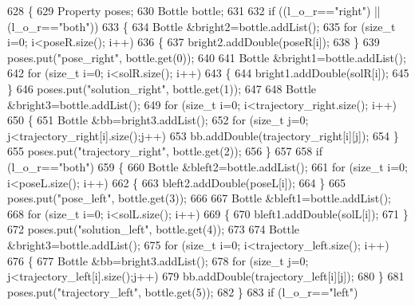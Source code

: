 \begin{DoxyCode}
628 \{
629     Property poses;
630     Bottle bottle;
631 
632     \textcolor{keywordflow}{if} ((l\_o\_r==\textcolor{stringliteral}{"right"}) || (l\_o\_r==\textcolor{stringliteral}{"both"}))
633     \{
634         Bottle &bright2=bottle.addList();
635         \textcolor{keywordflow}{for} (\textcolor{keywordtype}{size\_t} i=0; i<poseR.size(); i++)
636         \{
637             bright2.addDouble(poseR[i]);
638         \}
639         poses.put(\textcolor{stringliteral}{"pose\_right"}, bottle.get(0));
640 
641         Bottle &bright1=bottle.addList();
642         \textcolor{keywordflow}{for} (\textcolor{keywordtype}{size\_t} i=0; i<solR.size(); i++)
643         \{
644             bright1.addDouble(solR[i]);
645         \}
646         poses.put(\textcolor{stringliteral}{"solution\_right"}, bottle.get(1));
647 
648         Bottle &bright3=bottle.addList();
649         \textcolor{keywordflow}{for} (\textcolor{keywordtype}{size\_t} i=0; i<trajectory\_right.size(); i++)
650         \{
651             Bottle &bb=bright3.addList();
652             \textcolor{keywordflow}{for} (\textcolor{keywordtype}{size\_t} j=0; j<trajectory\_right[i].size();j++)
653                 bb.addDouble(trajectory\_right[i][j]);
654         \}
655         poses.put(\textcolor{stringliteral}{"trajectory\_right"}, bottle.get(2));
656     \}
657 
658     \textcolor{keywordflow}{if} (l\_o\_r==\textcolor{stringliteral}{"both"})
659     \{
660         Bottle &bleft2=bottle.addList();
661         \textcolor{keywordflow}{for} (\textcolor{keywordtype}{size\_t} i=0; i<poseL.size(); i++)
662         \{
663             bleft2.addDouble(poseL[i]);
664         \}
665         poses.put(\textcolor{stringliteral}{"pose\_left"}, bottle.get(3));
666 
667         Bottle &bleft1=bottle.addList();
668         \textcolor{keywordflow}{for} (\textcolor{keywordtype}{size\_t} i=0; i<solL.size(); i++)
669         \{
670             bleft1.addDouble(solL[i]);
671         \}
672         poses.put(\textcolor{stringliteral}{"solution\_left"}, bottle.get(4));
673 
674         Bottle &bright3=bottle.addList();
675         \textcolor{keywordflow}{for} (\textcolor{keywordtype}{size\_t} i=0; i<trajectory\_left.size(); i++)
676         \{
677             Bottle &bb=bright3.addList();
678             \textcolor{keywordflow}{for} (\textcolor{keywordtype}{size\_t} j=0; j<trajectory\_left[i].size();j++)
679                 bb.addDouble(trajectory\_left[i][j]);
680         \}
681         poses.put(\textcolor{stringliteral}{"trajectory\_left"}, bottle.get(5));
682     \}
683     \textcolor{keywordflow}{if} (l\_o\_r==\textcolor{stringliteral}{"left"})

\end{DoxyCode}
